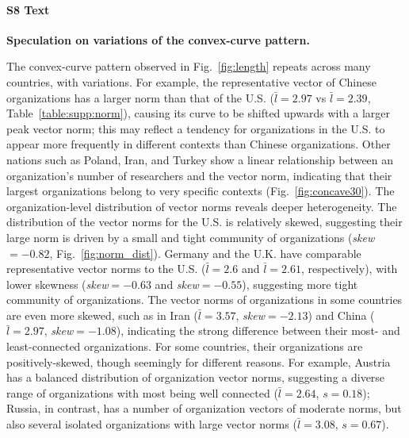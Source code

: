 \documentclass[12pt]{article} %
\begin{document}
%
\paragraph*{S8 Text}
\label{si:text:boomerang_speculation}
{\bf Speculation on variations of the convex-curve pattern.}

The convex-curve pattern observed in Fig.~\ref{fig:length} repeats across many countries, with variations.
For example, the representative vector of Chinese organizations has a larger norm than that of the U.S. ($\bar{l} = 2.97$ vs $\bar{l} = 2.39$, Table~\ref{table:supp:norm}), causing its curve to be shifted upwards with a larger peak vector norm;
this may reflect a tendency for organizations in the U.S. to appear more frequently in different contexts than Chinese organizations.
Other nations such as Poland, Iran, and Turkey show a linear relationship between an organization's number of researchers and the vector norm, indicating that their largest organizations belong to very specific contexts (Fig.~\ref{fig:concave30}).
The organization-level distribution of vector norms reveals deeper heterogeneity.
The distribution of the vector norms for the U.S. is relatively skewed, suggesting their large norm is driven by a small and tight community of organizations (\textit{skew}$ = -0.82$, Fig.~\ref{fig:norm_dist}).
Germany and the U.K. have comparable representative vector norms to the U.S. ($\bar{l} = 2.6$ and $\bar{l} = 2.61$, respectively), with lower skewness (\textit{skew}$ = -0.63$ and \textit{skew}$ = -0.55$), suggesting more tight community of organizations.
The vector norms of organizations in some countries are even more skewed, such as in Iran ($\bar{l} = 3.57$, \textit{skew}$ = -2.13$) and China ($\bar{l} = 2.97$, \textit{skew}$ = -1.08$), indicating the strong difference between their most- and least-connected organizations.
For some countries, their organizations are positively-skewed, though seemingly for different reasons.
For example, Austria has a balanced distribution of organization vector norms, suggesting a diverse range of organizations with most being well connected ($\bar{l} =2.64$, $s = 0.18$);
Russia, in contrast, has a number of organization vectors of moderate norms, but also several isolated organizations with large vector norms ($\bar{l} = 3.08$, $s = 0.67$).


\newpage
\end{document}
